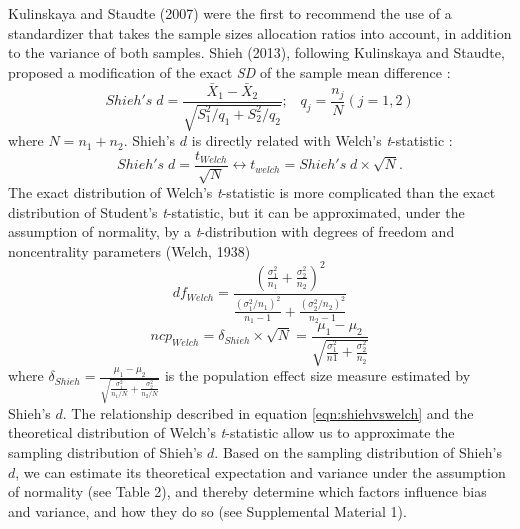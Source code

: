 \documentclass[
  english,
  man,floatsintext]{apa6}
\begin{document}
Kulinskaya and Staudte (2007) were the first to recommend the use of a standardizer that takes the sample sizes allocation ratios into account, in addition to the variance of both samples. Shieh (2013), following Kulinskaya and Staudte, proposed a modification of the exact \emph{SD} of the sample mean difference :
\begin{equation*} 
Shieh's \; d = \frac{\bar{X}_1 - \bar{X}_2}{\sqrt{S_1^2/q_1+S_2^2/q_2}}; \;\;\; q_j=\frac{n_j}{N} (j=1,2)
\label{eqn:Shiehds}
\end{equation*}
where \(N = n_1+n_2\). Shieh's \(d\) is directly related with Welch's \emph{t}-statistic :
\begin{equation} 
Shieh's \; d=\frac{t_{Welch}}{\sqrt{N}}\leftrightarrow t_{welch} = Shieh's \; d \times \sqrt{N}.
\label{eqn:shiehvswelch}
\end{equation}
The exact distribution of Welch's \emph{t}-statistic is more complicated than the exact distribution of Student's \emph{t}-statistic, but it can be approximated, under the assumption of normality, by a \emph{t}-distribution with degrees of freedom and noncentrality parameters (Welch, 1938)
\begin{equation} 
df_{Welch} = \frac{\left(\frac{\sigma^2_1}{n_1}+\frac{\sigma^2_2}{n_2} \right)^2}{\frac{(\sigma^2_1/n_1)^2}{n_1-1}+\frac{(\sigma^2_2/n_2)^2}{n_2-1}}
\label{eqn:welchdf}
\end{equation}
\begin{equation*} 
ncp_{Welch} = \delta_{Shieh} \times \sqrt{N} = \frac{\mu_1-\mu_2}{\sqrt{\frac{\sigma_1^2}{n1}+\frac{\sigma_2^2}{n_2}}}
\label{eqn:welchncp}
\end{equation*}
where \(\delta_{Shieh}=\frac{\mu_1-\mu_2}{\sqrt{\frac{\sigma_1^2}{n_1/N}+\frac{\sigma_2^2}{n_2/N}}}\) is the population effect size measure estimated by Shieh's \(d\). The relationship described in equation \ref{eqn:shiehvswelch} and the theoretical distribution of Welch's \emph{t}-statistic allow us to approximate the sampling distribution of Shieh's \(d\). Based on the sampling distribution of Shieh's \(d\), we can estimate its theoretical expectation and variance under the assumption of normality (see Table 2), and thereby determine which factors influence bias and variance, and how they do so (see Supplemental Material 1).
\end{document}
